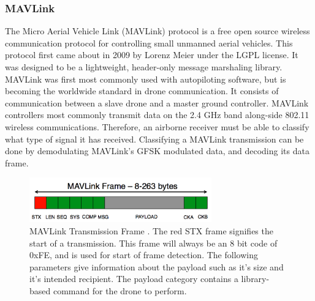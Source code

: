 \subsubsection{MAVLink}
The Micro Aerial Vehicle Link (MAVLink) protocol is a free open source wireless communication protocol for controlling small unmanned aerial vehicles. This protocol first came about in 2009 by Lorenz Meier under the LGPL license. \cite{MAVLINK_Website}  It was designed to be a lightweight, header-only message marshaling library.  MAVLink was first most commonly used with autopiloting software, but is becoming the worldwide standard in drone communication. It consists of communication between a slave drone and a master ground controller.  MAVLink controllers most commonly transmit data on the 2.4 GHz band along-side 802.11 wireless communications. Therefore, an airborne receiver must be able to classify what type of signal it has received. Classifying a MAVLink transmission can be done by demodulating MAVLink's GFSK modulated data, and decoding its data frame.  
\begin{figure}[ht]
\centering
\includegraphics[width=0.70\textwidth]{img/mavlink-packet.png}
\caption{MAVLink Transmission Frame \cite{mavlinkphoto}. The red STX frame signifies the start of a transmission. This frame will always be an 8 bit code of 0xFE, and is used for start of frame detection. The following parameters give information about the payload such as it's size and it's intended recipient.  The payload category contains a library-based command for the drone to perform.}
\label{fig:MAVlink_frame}
\end{figure} \par
